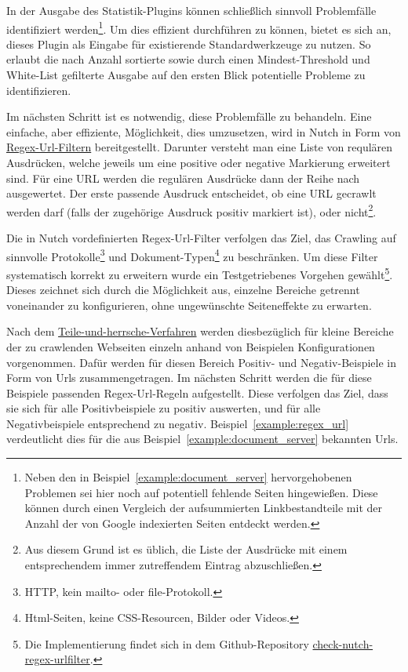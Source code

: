 In der Ausgabe des Statistik-Plugins können schließlich sinnvoll Problemfälle identifiziert
werden\footnote{Neben den in Beispiel~\ref{example:document_server} hervorgehobenen Problemen sei hier noch auf potentiell fehlende Seiten hingewießen.
Diese können durch einen Vergleich der aufsummierten Linkbestandteile mit der Anzahl der von Google indexierten Seiten entdeckt werden.}.
Um dies effizient durchführen zu können,
bietet es sich an, dieses Plugin als Eingabe für existierende Standardwerkzeuge zu nutzen.
So erlaubt die nach Anzahl sortierte sowie durch einen Mindest-Threshold und White-List gefilterte Ausgabe
auf den ersten Blick potentielle Probleme zu identifizieren.

Im nächsten Schritt ist es notwendig, diese Problemfälle zu behandeln.
Eine einfache, aber effiziente, Möglichkeit, dies umzusetzen, wird in Nutch in Form von \href{https://github.com/apache/nutch/blob/master/conf/regex-urlfilter.txt.template}{Regex-Url-Filtern} bereitgestellt.
Darunter versteht man eine Liste von requlären Ausdrücken, welche jeweils um eine positive oder negative Markierung erweitert sind.
Für eine URL werden die regulären Ausdrücke dann der Reihe nach ausgewertet.
Der erste passende Ausdruck entscheidet, ob eine URL gecrawlt werden darf (falls der zugehörige Ausdruck positiv markiert ist),
oder nicht\footnote{Aus diesem Grund ist es üblich, 
die Liste der Ausdrücke mit einem entsprechendem immer zutreffendem Eintrag abzuschließen.}.

Die in Nutch vordefinierten Regex-Url-Filter verfolgen das Ziel,
das Crawling auf sinnvolle Protokolle\footnote{HTTP, kein mailto- oder file-Protokoll.}
und Dokument-Typen\footnote{Html-Seiten, keine CSS-Resourcen, Bilder oder Videos.} zu beschränken.
Um diese Filter systematisch korrekt zu erweitern wurde ein
Testgetriebenes Vorgehen gewählt\footnote{Die Implementierung findet
sich in dem Github-Repository \href{https://github.com/mam10eks/check-nutch-regex-urlfilter}{check-nutch-regex-urlfilter}.}.
Dieses zeichnet sich durch die Möglichkeit aus, einzelne Bereiche getrennt voneinander zu konfigurieren, ohne ungewünschte Seiteneffekte zu erwarten.

Nach dem \href{https://de.wikipedia.org/wiki/Teile-und-herrsche-Verfahren}{Teile-und-herrsche-Verfahren} werden
diesbezüglich für kleine Bereiche der zu crawlenden Webseiten einzeln anhand von Beispielen Konfigurationen vorgenommen.
Dafür werden für diesen Bereich Positiv- und Negativ-Beispiele in Form von Urls zusammengetragen.
Im nächsten Schritt werden die für diese Beispiele passenden Regex-Url-Regeln aufgestellt.
Diese verfolgen das Ziel, dass sie sich für alle Positivbeispiele zu positiv auswerten, und für alle Negativbeispiele entsprechend zu negativ.
Beispiel~\ref{example:regex_url} verdeutlicht dies für die aus Beispiel~\ref{example:document_server} bekannten Urls.

